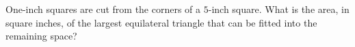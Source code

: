 One-inch squares are cut from the corners of a $5$-inch square. What is the area, in square inches, of the largest equilateral triangle that can be fitted into the remaining space?
